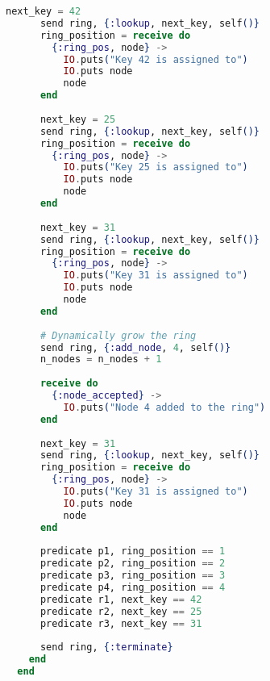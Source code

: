 \begin{lstlisting}[language=Elixir, xleftmargin=.1\linewidth]
      next_key = 42
      send ring, {:lookup, next_key, self()}
      ring_position = receive do
        {:ring_pos, node} ->
          IO.puts("Key 42 is assigned to")
          IO.puts node
          node
      end
  
      next_key = 25
      send ring, {:lookup, next_key, self()}
      ring_position = receive do
        {:ring_pos, node} ->
          IO.puts("Key 25 is assigned to")
          IO.puts node
          node
      end
  
      next_key = 31
      send ring, {:lookup, next_key, self()}
      ring_position = receive do
        {:ring_pos, node} ->
          IO.puts("Key 31 is assigned to")
          IO.puts node
          node
      end
  
      # Dynamically grow the ring
      send ring, {:add_node, 4, self()}
      n_nodes = n_nodes + 1
  
      receive do
        {:node_accepted} ->
          IO.puts("Node 4 added to the ring")
      end
  
      next_key = 31
      send ring, {:lookup, next_key, self()}
      ring_position = receive do
        {:ring_pos, node} ->
          IO.puts("Key 31 is assigned to")
          IO.puts node
          node
      end
  
      predicate p1, ring_position == 1
      predicate p2, ring_position == 2
      predicate p3, ring_position == 3
      predicate p4, ring_position == 4
      predicate r1, next_key == 42
      predicate r2, next_key == 25
      predicate r3, next_key == 31
  
      send ring, {:terminate}
    end
  end  
\end{lstlisting}

